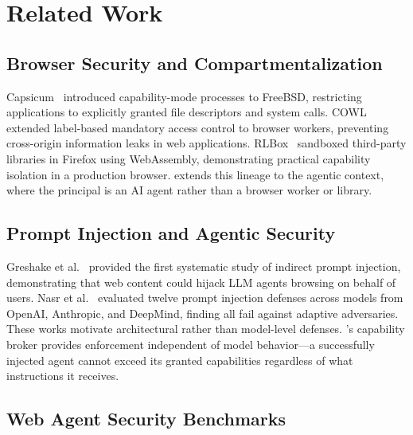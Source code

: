 
\section{Related Work}
\label{sec:related_work}

\subsection{Browser Security and Compartmentalization}

Capsicum~\cite{watson2010capsicum} introduced capability-mode
processes to FreeBSD, restricting applications to explicitly
granted file descriptors and system calls.
COWL~\cite{stefan2014cowl} extended label-based mandatory
access control to browser workers, preventing cross-origin
information leaks in web applications.
RLBox~\cite{narayan2020rlbox} sandboxed third-party libraries
in Firefox using WebAssembly, demonstrating practical capability
isolation in a production browser.
\ferrite{} extends this lineage to the agentic context, where
the principal is an AI agent rather than a browser worker or
library.

\subsection{Prompt Injection and Agentic Security}

Greshake et al.~\cite{greshake2023not} provided the first
systematic study of indirect prompt injection, demonstrating
that web content could hijack LLM agents browsing on behalf
of users.
Nasr et al.~\cite{nasr2025} evaluated twelve prompt injection
defenses across models from OpenAI, Anthropic, and DeepMind,
finding all fail against adaptive adversaries.
These works motivate architectural rather than model-level defenses.
\ferrite{}'s capability broker provides enforcement independent
of model behavior---a successfully injected agent cannot exceed
its granted capabilities regardless of what instructions it receives.

\subsection{Web Agent Security Benchmarks}

